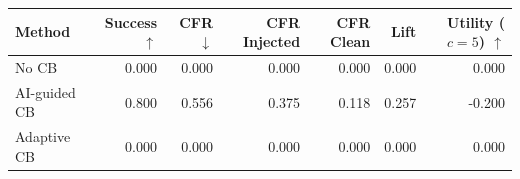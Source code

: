 \begin{tabular}{lrrrrrr}
\toprule
Method & Success $\uparrow$ & CFR $\downarrow$ & CFR Injected & CFR Clean & Lift & Utility ($c=5$) $\uparrow$ \\
\midrule
No CB & 0.000 & 0.000 & 0.000 & 0.000 & 0.000 & 0.000 \\
AI-guided CB & 0.800 & 0.556 & 0.375 & 0.118 & 0.257 & -0.200 \\
Adaptive CB & 0.000 & 0.000 & 0.000 & 0.000 & 0.000 & 0.000 \\
\bottomrule
\end{tabular}
